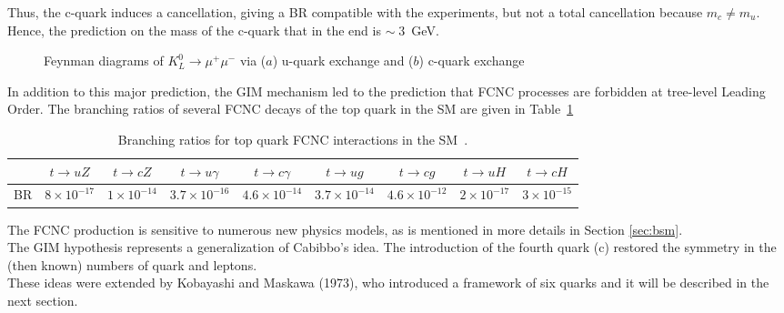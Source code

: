 Thus, the c-quark induces a cancellation, giving a BR compatible with the experiments, but not a total cancellation because $m_{c}\neq m_{u}$. Hence, the prediction on the mass of the
c-quark that in the end is $\sim\; 3$~GeV.
\begin{figure}[h]
	\centering
		\qquad
	\caption{Feynman diagrams of $K^{0}_{L}\rightarrow \mu^{+} \mu^{-}$ via ($a$) u-quark exchange and ($b$) c-quark exchange}
\end{figure}
In addition to this major prediction, the GIM mechanism led to the prediction that FCNC processes are forbidden at tree-level Leading Order. The branching ratios of several FCNC decays of the top quark in the SM are given in Table~\ref{tab:SM_BR}
\begin{table}[h]
	\begin{adjustbox}{max width=1.\textwidth,center}
		\begin{tabular}{|c|c|c|c|c|c|c|c|c|}
		\hline 
  & $ t\rightarrow uZ$    & $ t\rightarrow cZ$    & $ t\rightarrow u\gamma$ & $ t\rightarrow c\gamma$ & $ t\rightarrow ug$       & $ t\rightarrow cg$       & $ t\rightarrow uH$     & $ t\rightarrow cH$  \\ 
	\hline 
	BR & $8\times 10^{-17} $ & $1\times 10^{-14} $ & $3.7\times 10^{-16} $       & $4.6\times 10^{-14} $      & $3.7\times 10^{-14} $  & $4.6\times 10^{-12} $ & $2\times 10^{-17} $  &$3\times 10^{-15} $  \\ 
		\hline 
		\end{tabular} 
	\end{adjustbox}
\caption{Branching ratios for top quark FCNC interactions in the SM~\cite{aguilar}.}
\label{tab:SM_BR}
\end{table}
\noindent The FCNC production is sensitive to numerous new physics models, as is mentioned in more details in Section \ref{sec:bsm}.\\
The GIM hypothesis represents a generalization of Cabibbo's idea. The introduction of the fourth quark (c) restored the symmetry
in the (then known)  numbers of quark and leptons.\\
These ideas were extended by Kobayashi and Maskawa (1973), who introduced a framework of six quarks and it will be described in the next section.

